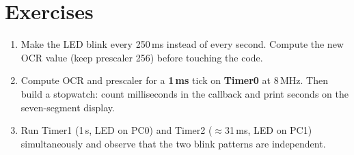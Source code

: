 \documentclass[11pt,a4paper]{article}
\begin{document}
\section{Exercises}

\begin{enumerate}
  \item Make the LED blink every 250\,ms instead of every second. Compute the
        new OCR value (keep prescaler 256) before touching the code.
  \item Compute OCR and prescaler for a \textbf{1\,ms} tick on
        \textbf{Timer0} at 8\,MHz. Then build a stopwatch: count milliseconds
        in the callback and print seconds on the seven-segment display.
  \item Run Timer1 (1\,s, LED on PC0) and Timer2 ($\approx$31\,ms, LED on PC1)
        simultaneously and observe that the two blink patterns are
        independent.
\end{enumerate}
\end{document}
